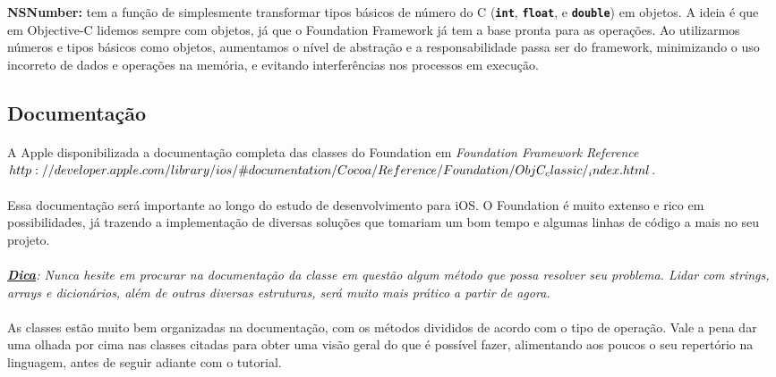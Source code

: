 \documentclass[a4paper,12pt,brazil,doubleside]{book}
\begin{document}
\begin{description}
\item{\textbf{NSNumber:} tem a função de simplesmente transformar tipos básicos de número do C (\texttt{\textbf{int}}, \texttt{\textbf{float}}, e \texttt{\textbf{double}}) em objetos. A ideia é que em Objective-C lidemos sempre com objetos, já que o Foundation Framework já tem a base pronta para as operações. Ao utilizarmos números e tipos básicos como objetos, aumentamos o nível de abstração e a responsabilidade passa ser do framework, minimizando o uso incorreto de dados e operações na memória, e evitando interferências nos processos em execução.}
\end{description}

\subsection{Documentação}

\paragraph{}A Apple disponibilizada a documentação completa das classes do Foundation em
\emph{Foundation Framework Reference\\ \(http://developer.apple.com/library/ios/\#documentation/Cocoa/Reference/Foundation/\\ObjC_classic/_index.html\)}.
\paragraph{}Essa documentação será importante ao longo do estudo de desenvolvimento para iOS. O Foundation é muito extenso e rico em possibilidades, já trazendo a implementação de diversas soluções que tomariam um bom tempo e algumas linhas de código a mais no seu projeto.
\paragraph{}\textit{\textbf{\underline{Dica}}: Nunca hesite em procurar na documentação da classe em questão algum método que possa resolver seu problema. Lidar com strings, arrays e dicionários, além de outras diversas estruturas, será muito mais prático a partir de agora.}
\paragraph{}As classes estão muito bem organizadas na documentação, com os métodos divididos de acordo com o tipo de operação. Vale a pena dar uma olhada por cima nas classes citadas para obter uma visão geral do que é possível fazer, alimentando aos poucos o seu repertório na linguagem, antes de seguir adiante com o tutorial.
\end{document}
